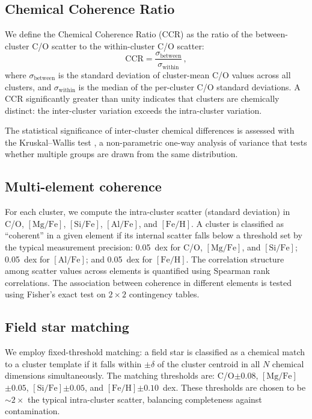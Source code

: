 \documentclass[fleqn,usenatbib]{mnras}
\newcommand{\feh}{$\mathrm{[Fe/H]}$\xspace}
\newcommand{\mgfe}{$\mathrm{[Mg/Fe]}$\xspace}
\newcommand{\sife}{$\mathrm{[Si/Fe]}$\xspace}
\newcommand{\alfe}{$\mathrm{[Al/Fe]}$\xspace}
\newcommand{\co}{C/O\xspace}
\begin{document}
\subsection{Chemical Coherence Ratio}
\label{sec:ccr}

We define the Chemical Coherence Ratio (CCR) as the ratio of the between-cluster \co scatter to the within-cluster \co scatter:
\begin{equation}
\mathrm{CCR} = \frac{\sigma_{\mathrm{between}}}{\sigma_{\mathrm{within}}} \,,
\label{eq:ccr}
\end{equation}
where $\sigma_{\mathrm{between}}$ is the standard deviation of cluster-mean \co values across all clusters, and $\sigma_{\mathrm{within}}$ is the median of the per-cluster \co standard deviations.
A CCR significantly greater than unity indicates that clusters are chemically distinct: the inter-cluster variation exceeds the intra-cluster variation.

The statistical significance of inter-cluster chemical differences is assessed with the Kruskal--Wallis test \citep{Kruskal1952}, a non-parametric one-way analysis of variance that tests whether multiple groups are drawn from the same distribution.

\subsection{Multi-element coherence}
\label{sec:multielement}

For each cluster, we compute the intra-cluster scatter (standard deviation) in \co, \mgfe, \sife, \alfe, and \feh.
A cluster is classified as ``coherent'' in a given element if its internal scatter falls below a threshold set by the typical measurement precision: 0.05~dex for \co, \mgfe, and \sife; 0.05~dex for \alfe; and 0.05~dex for \feh.
The correlation structure among scatter values across elements is quantified using Spearman rank correlations.
The association between coherence in different elements is tested using Fisher's exact test on $2 \times 2$ contingency tables.

\subsection{Field star matching}
\label{sec:matching}

We employ fixed-threshold matching: a field star is classified as a chemical match to a cluster template if it falls within $\pm \delta$ of the cluster centroid in all $N$ chemical dimensions simultaneously.
The matching thresholds are: \co $\pm 0.08$, \mgfe $\pm 0.05$, \sife $\pm 0.05$, and \feh $\pm 0.10$~dex.
These thresholds are chosen to be ${\sim}2\times$ the typical intra-cluster scatter, balancing completeness against contamination.
\end{document}
